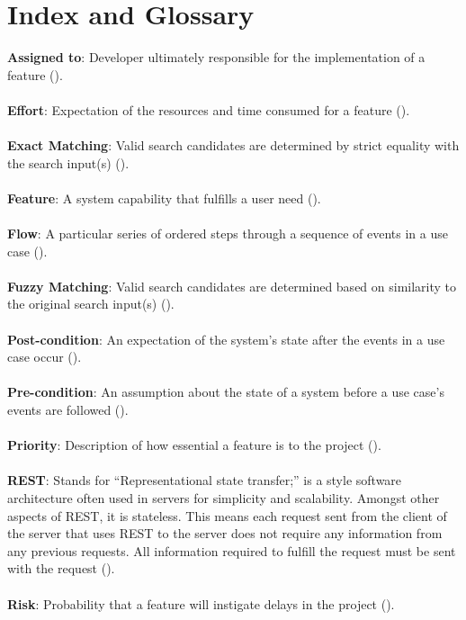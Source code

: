 \documentclass{article}
\begin{document}
\section{Index and Glossary}
\textbf{Assigned to}: Developer ultimately responsible for the implementation of a feature (\pageref{feature}).\\ \\
\textbf{Effort}: Expectation of the resources and time consumed for a feature (\pageref{feature}).\\ \\
\textbf{Exact Matching}: Valid search candidates are determined by strict equality with the search input(s) (\pageref{feature}).\\ \\
\textbf{Feature}: A system capability that fulfills a user need (\pageref{feature}).\\ \\
\textbf{Flow}: A particular series of ordered steps through a sequence of events in a use case (\pageref{flow}).\\ \\
\textbf{Fuzzy Matching}: Valid search candidates are determined based on similarity to the original search input(s) (\pageref{feature}).\\ \\
\textbf{Post-condition}: An expectation of the system's state after the events in a use case occur (\pageref{post_cond}).\\ \\
\textbf{Pre-condition}: An assumption about the state of a system before a use case's events are followed (\pageref{pre_cond}).\\ \\
\textbf{Priority}: Description of how essential a feature is to the project (\pageref{feature}).\\ \\
\textbf{REST}: Stands for ``Representational state transfer;'' is a style software architecture often used in servers for simplicity and scalability. Amongst other aspects of REST, it is stateless. This means each request sent from the client of the server that uses REST to the server does not require any information from any previous requests. All information required to fulfill the request must be sent with the request (\pageref{rest}).\\ \\
\textbf{Risk}: Probability that a feature will instigate delays in the project (\pageref{feature}).\\ \\
\end{document}
